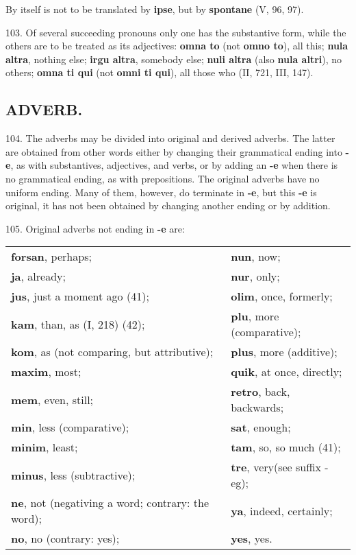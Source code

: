 By itself is not to be translated by \textbf{ipse}, but by \textbf{spontane} (V, 96, 97).

103. Of several succeeding pronouns only one has the substantive form, while the others are to be treated as its adjectives: \textbf{omna to} (not \textbf{omno to}), all this; \textbf{nula altra}, nothing else; \textbf{irgu altra}, somebody else; \textbf{nuli altra} (also \textbf{nula altri}), no others; \textbf{omna ti qui} (not \textbf{omni ti qui}), all those who (II, 721, III, 147).

\subsection*{ADVERB.}
104. The adverbs may be divided into original and derived adverbs. The latter are obtained from other words either by changing their grammatical ending into \textbf{-e}, as with substantives, adjectives, and verbs, or by adding an \textbf{-e} when there is no grammatical ending, as with prepositions. The original adverbs have no uniform ending. Many of them, however, do terminate in \textbf{-e}, but this \textbf{-e} is original, it has not been obtained by changing another ending or by addition.

105. Original adverbs not ending in \textbf{-e} are:

\begin{tabular}{l l}
\textbf{forsan}, perhaps; & \textbf{nun}, now; \\
\textbf{ja}, already; & \textbf{nur}, only; \\
\textbf{jus}, just a moment ago (41); & \textbf{olim}, once, formerly; \\
\textbf{kam}, than, as (I, 218) (42); & \textbf{plu}, more (comparative); \\
\textbf{kom}, as (not comparing, but attributive); & \textbf{plus}, more (additive); \\
\textbf{maxim}, most; & \textbf{quik}, at once, directly; \\
\textbf{mem}, even, still; & \textbf{retro}, back, backwards; \\
\textbf{min}, less (comparative); & \textbf{sat}, enough; \\
\textbf{minim}, least; & \textbf{tam}, so, so much (41); \\
\textbf{minus}, less (subtractive); & \textbf{tre}, very\footnotemark[1] (see suffix -eg); \\
\textbf{ne}, not (negativing a word; contrary: the word); & \textbf{ya}, indeed, certainly; \\
\textbf{no}, no (contrary: yes); & \textbf{yes}, yes.
\end{tabular}

